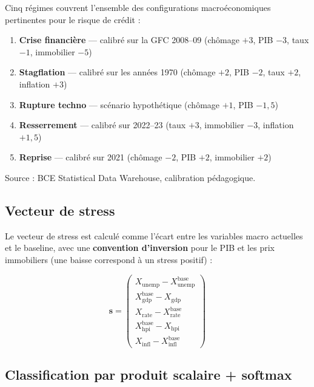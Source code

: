 \documentclass[12pt,a4paper]{article}
\begin{document}
\begin{definitionbox}
Cinq r\'egimes couvrent l'ensemble des configurations macro\-\'economiques pertinentes
pour le risque de cr\'edit :
\begin{enumerate}[nosep]
    \item \textbf{Crise financi\`ere} --- calibr\'e sur la GFC 2008--09
          (ch\^omage $+3$, PIB $-3$, taux $-1$, immobilier $-5$)
    \item \textbf{Stagflation} --- calibr\'e sur les ann\'ees 1970
          (ch\^omage $+2$, PIB $-2$, taux $+2$, inflation $+3$)
    \item \textbf{Rupture techno} --- sc\'enario hypoth\'etique
          (ch\^omage $+1$, PIB $-1{,}5$)
    \item \textbf{Resserrement} --- calibr\'e sur 2022--23
          (taux $+3$, immobilier $-3$, inflation $+1{,}5$)
    \item \textbf{Reprise} --- calibr\'e sur 2021
          (ch\^omage $-2$, PIB $+2$, immobilier $+2$)
\end{enumerate}
Source : BCE Statistical Data Warehouse, calibration p\'edagogique.
\end{definitionbox}

\subsection{Vecteur de stress}

Le vecteur de stress est calcul\'e comme l'\'ecart entre les variables macro
actuelles et le baseline, avec une \textbf{convention d'inversion} pour le PIB
et les prix immobiliers (une baisse correspond \`a un stress positif) :

\begin{equation}
    \mathbf{s} = \begin{pmatrix}
        X_{\text{unemp}} - X_{\text{unemp}}^{\text{base}} \\
        X_{\text{gdp}}^{\text{base}} - X_{\text{gdp}} \\
        X_{\text{rate}} - X_{\text{rate}}^{\text{base}} \\
        X_{\text{hpi}}^{\text{base}} - X_{\text{hpi}} \\
        X_{\text{infl}} - X_{\text{infl}}^{\text{base}}
    \end{pmatrix}
    \label{eq:stress_vector}
\end{equation}

\subsection{Classification par produit scalaire + softmax}
\end{document}
